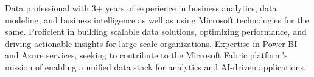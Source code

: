 \setlength{\parindent}{2em} %
\begin{minipage}[t]{1\textwidth}
{\medium
Data professional with 3+ years of experience in business analytics, data modeling, and business intelligence as well as using Microsoft technologies for the same. Proficient in building scalable data solutions, optimizing performance, and driving actionable insights for large-scale organizations. Expertise in Power BI and Azure services, seeking to contribute to the Microsoft Fabric platform’s mission of enabling a unified data stack for analytics and AI-driven applications.
}
\end{minipage}
\\
